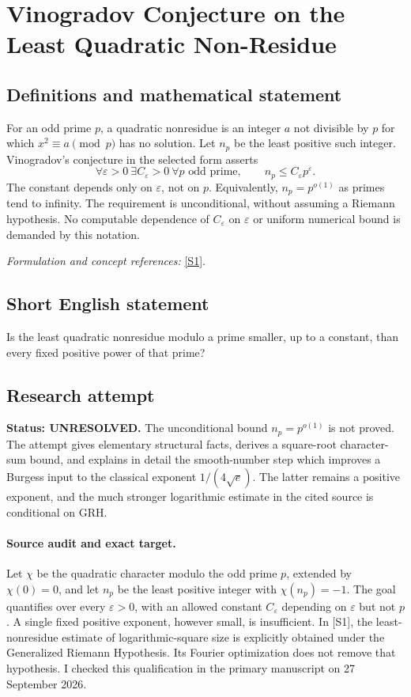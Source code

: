 \documentclass[11pt]{article}
\begin{document}
\section*{\texorpdfstring{Vinogradov Conjecture on the Least Quadratic Non-Residue}{Vinogradov Conjecture on the Least Quadratic Non-Residue}}\label{356}
\subsection{Definitions and mathematical statement}
For an odd prime $p$, a quadratic nonresidue is an integer $a$ not divisible by $p$ for which $x^2\equiv a\pmod p$ has no solution. Let $n_p$ be the least positive such integer. Vinogradov's conjecture in the selected form asserts
\[
 \forall{\varepsilon}>0\ \exists C_{\varepsilon}>0\ \forall p\text{ odd prime},
 \qquad n_p\le C_{\varepsilon} p^{\varepsilon}.
\]
The constant depends only on ${\varepsilon}$, not on $p$. Equivalently, $n_p=p^{o(1)}$ as primes tend to infinity. The requirement is unconditional, without assuming a Riemann hypothesis. No computable dependence of $C_{\varepsilon}$ on ${\varepsilon}$ or uniform numerical bound is demanded by this notation.
\par\smallskip\textit{Formulation and concept references:} \href{https://arxiv.org/pdf/2404.08380}{[S1]}.

\subsection{Short English statement}
Is the least quadratic nonresidue modulo a prime smaller, up to a constant, than every fixed positive power of that prime?
\subsection{Research attempt}
\textbf{Status: UNRESOLVED.} The unconditional bound $n_p=p^{o(1)}$ is not proved. The attempt gives elementary structural facts, derives a square-root character-sum bound, and explains in detail the smooth-number step which improves a Burgess input to the classical exponent $1/(4\sqrt e)$. The latter remains a positive exponent, and the much stronger logarithmic estimate in the cited source is conditional on GRH.

\paragraph{Source audit and exact target.}
Let $\chi$ be the quadratic character modulo the odd prime $p$, extended by $\chi(0)=0$, and let $n_p$ be the least positive integer with $\chi(n_p)=-1$. The goal quantifies over every $\varepsilon>0$, with an allowed constant $C_\varepsilon$ depending on $\varepsilon$ but not $p$. A single fixed positive exponent, however small, is insufficient. In [S1], the least-nonresidue estimate of logarithmic-square size is explicitly obtained under the Generalized Riemann Hypothesis. Its Fourier optimization does not remove that hypothesis. I checked this qualification in the primary manuscript on 27 September 2026.
\end{document}
